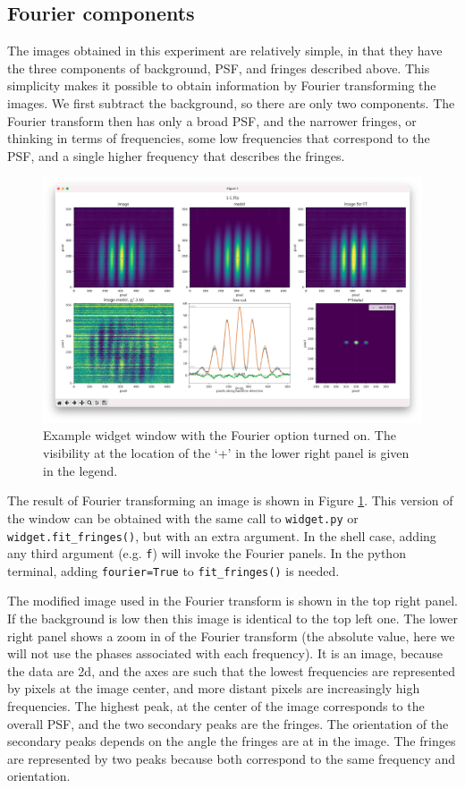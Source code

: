 \documentclass[11pt]{article}
\begin{document}
\subsection{Fourier components}\label{sec:fourier}

The images obtained in this experiment are relatively simple, in that they have the three components of background, PSF, and fringes described above. This simplicity makes it possible to obtain information by Fourier transforming the images. We first subtract the background, so there are only two components. The Fourier transform then has only a broad PSF, and the narrower fringes, or thinking in terms of frequencies, some low frequencies that correspond to the PSF, and a single higher frequency that describes the fringes.

\begin{figure}[h]
    \centering
   \includegraphics[width=1\textwidth]{widget-fourier.png}
    \caption{Example widget window with the Fourier option turned on. The visibility at the location of the `+' in the lower right panel is given in the legend.}
    \label{fig:widget-f}
\end{figure}

The result of Fourier transforming an image is shown in Figure \ref{fig:widget-f}. This version of the window can be obtained with the same call to \texttt{widget.py} or \texttt{widget.fit\_fringes()}, but with an extra argument. In the shell case, adding any third argument (e.g. \texttt{f}) will invoke the Fourier panels. In the python terminal, adding \texttt{fourier=True} to \texttt{fit\_fringes()} is needed.

The modified image used in the Fourier transform is shown in the top right panel. If the background is low then this image is identical to the top left one. The lower right panel shows a zoom in of the Fourier transform (the absolute value, here we will not use the phases associated with each frequency). It is an image, because the data are 2d, and the axes are such that the lowest frequencies are represented by pixels at the image center, and more distant pixels are increasingly high frequencies. The highest peak, at the center of the image corresponds to the overall PSF, and the two secondary peaks are the fringes. The orientation of the secondary peaks depends on the angle the fringes are at in the image. The fringes are represented by two peaks because both correspond to the same frequency and orientation.
\end{document}
